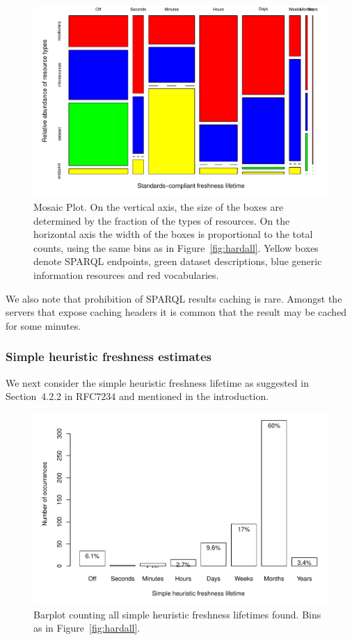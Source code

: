 \documentclass{llncs}
\begin{document}
\begin{figure}[ht]
  \centerline{%
    \includegraphics[width=.9\textwidth]{hardtable.pdf}}
  \caption{Mosaic Plot. On the vertical axis, the size of the boxes
    are determined by the fraction of the types of resources. On the
    horizontal axis the width of the boxes is proportional to the
    total counts, using the same bins as in
    Figure~\ref{fig:hardall}. Yellow boxes denote SPARQL endpoints,
    green dataset descriptions, blue generic information resources and
    red vocabularies.}
  \label{fig:hardtable}
\end{figure}


We also note that prohibition of SPARQL results caching is rare.
Amongst the servers that expose caching headers it is common
that the result may be cached for some minutes.

\subsubsection{Simple heuristic freshness estimates}\label{sec:simplefresh}

We next consider the simple heuristic freshness lifetime as suggested in
Section~4.2.2 in RFC7234 and mentioned in the introduction.

\begin{figure}[th!]
  \centerline{%
    \includegraphics[width=.9\textwidth]{heuristicall.pdf}}
  \caption{Barplot counting all simple heuristic freshness lifetimes
    found. Bins as in Figure~\ref{fig:hardall}.}
  \label{fig:heuristicall}
\end{figure}
\end{document}
